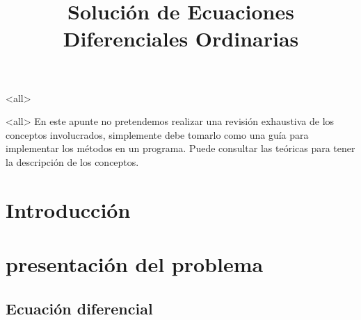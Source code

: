 \mode<all>









\title{
   Solución de Ecuaciones Diferenciales Ordinarias }
\subject{ Métodos de Euler y de Runge-Kutta}





\mode<all>
En este apunte no pretendemos realizar una revisión exhaustiva de los conceptos involucrados, 
simplemente debe tomarlo como una guía para implementar los métodos en un programa. Puede consultar
las teóricas para tener la descripción de los conceptos.

\section{Introducción}


\section{presentación del problema}

\subsection{Ecuación diferencial}

